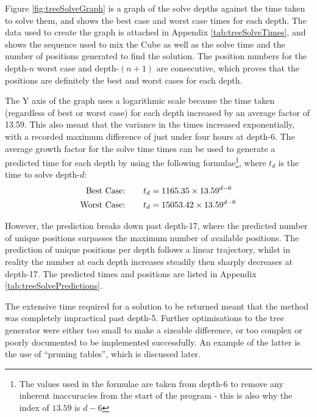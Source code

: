 \documentclass{report}
\newcommand{\depth}[1]{depth-#1}
\begin{document}
    Figure \ref{fig:treeSolveGraph} is a graph of the solve depths against the time taken to solve them, and shows the best case and worst case times for each depth. The data used to create the graph is attached in Appendix \ref{tab:treeSolveTimes}, and shows the sequence used to mix the Cube as well as the solve time and the number of positions generated to find the solution. The position numbers for the \depth{$n$} worst case and \depth{$(n+1)$} are consecutive, which proves that the positions are definitely the best and worst cases for each depth.
    
    The Y axis of the graph uses a logarithmic scale because the time taken (regardless of best or worst case) for each depth increased by an average factor of 13.59. This also meant that the variance in the times increased exponentially, with a recorded maximum difference of just under four hours at \depth{6}. The average growth factor for the solve time times can be used to generate a predicted time for each depth by using the following formulae\footnote{The values used in the formulae are taken from \depth{6} to remove any inherent inaccuracies from the start of the program - this is also why the index of $13.59$ is $d-6$}, where $t_d$ is the time to solve \depth{$d$}:
   	\begin{align*}
   	\text{Best Case:}\hspace{7.5mm} 	&	t_d = 1165.35 \times 13.59^{d-6} \\
	\text{Worst Case:}\hspace{7.5mm}	&	t_d = 15053.42 \times 13.59^{d-6}
   	\end{align*}
   	
    However, the prediction breaks down past \depth{17}, where the predicted number of unique positions surpasses the maximum number of available positions. The prediction of unique positions per depth follows a linear trajectory, whilst in reality the number at each depth increases steadily then sharply decreases at \depth{17}. The predicted times and positions are listed in Appendix \ref{tab:treeSolvePredictions}.
    
    The extensive time required for a solution to be returned meant that the method was completely impractical past \depth{5}. Further optimisations to the tree generator were either too small to make a sizeable difference, or too complex or poorly documented to be implemented successfully. An example of the latter is the use of \enquote{pruning tables}, which is discussed later.
    
\end{document}
